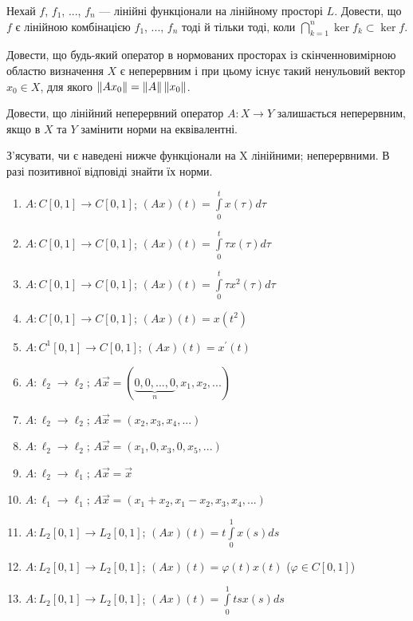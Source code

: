 \begin{exercise}
    Нехай $f$, $f_1$, ..., $f_n$ --- лінійні функціонали на лінійному просторі $L$. 
    Довести, що $f$ є лінійною комбінацією $f_1$, ..., $f_n$ тоді й тільки тоді, 
    коли $\bigcap\limits_{k=1}^n \ker f_k \subset \ker f$.
\end{exercise}

\begin{exercise}
    Довести, що будь-який оператор в нормованих просторах із скінченновимірною областю 
    визначення $X$ є неперервним і при цьому існує такий ненульовий вектор $x_0 \in X$, 
    для якого $\left\lVert Ax_0\right\rVert = \left\lVert A\right\rVert\left\lVert x_0\right\rVert$.
\end{exercise}

\begin{exercise}
    Довести, що лінійний неперервний оператор $A: X \rightarrow Y$ залишається неперервним, 
    якщо в $X$ та $Y$ замінити норми на еквівалентні.
\end{exercise}

\begin{exercise}
    З'ясувати, чи є наведені нижче функціонали на X лінійними; 
    неперервними. В разі позитивної відповіді знайти їх норми.
    \begin{enumerate}[label=\ukr*)]
        \item $A: C[0, 1] \rightarrow C[0, 1]$; $(Ax)(t) = \int\limits_0^t x(\tau) d\tau$
        \item $A: C[0, 1] \rightarrow C[0, 1]$; $(Ax)(t) = \int\limits_0^t \tau x(\tau) d\tau$
        \item $A: C[0, 1] \rightarrow C[0, 1]$; $(Ax)(t) = \int\limits_0^t \tau x^2(\tau) d\tau$
        \item $A: C[0, 1] \rightarrow C[0, 1]$; $(Ax)(t) = x(t^2)$
        \item $A: C^1[0, 1] \rightarrow C[0, 1]$; $(Ax)(t) = x^\prime (t)$ 
        \item $A: \ell_2 \rightarrow \ell_2$; $A\vec{x} = (\underbrace{0,0,...,0}_n,
        x_1,x_2,...)$
        \item $A: \ell_2 \rightarrow \ell_2$; $A\vec{x} = (x_2,x_3,x_4,...)$
        \item $A: \ell_2 \rightarrow \ell_2$; $A\vec{x} = (x_1,0,x_3,0,x_5,...)$
        \item $A: \ell_2 \rightarrow \ell_1$; $A\vec{x} = \vec{x}$
        \item $A: \ell_1 \rightarrow \ell_1$; $A\vec{x} = (x_1+x_2, x_1-x_2, x_3, x_4, ...)$
        \item $A: L_2[0, 1] \rightarrow L_2[0, 1]$; $(Ax)(t) = t \int\limits_0^1 x(s)ds$
        \item $A: L_2[0, 1] \rightarrow L_2[0, 1]$; $(Ax)(t) = \varphi(t)x(t)$ 
        ($\varphi \in C[0,1]$)
        \item $A: L_2[0, 1] \rightarrow L_2[0, 1]$; $(Ax)(t) = \int\limits_0^1 tsx(s)ds$
    \end{enumerate}
\end{exercise}